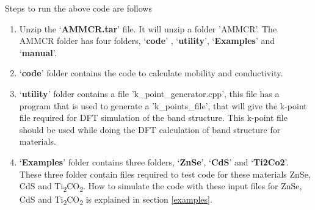 \documentclass[12pt]{article}
\begin{document}
Steps to run the above code are follows

\begin{enumerate}

\item Unzip the \lq \textbf{AMMCR.tar}\rq \hspace{0.5mm} file. It will unzip a folder 'AMMCR'. The AMMCR folder has four folders, \lq \textbf{code}\rq \hspace{0.5mm} , \lq \textbf{utility}\rq \hspace{0.5mm}, \lq \textbf{Examples}\rq \hspace{0.5mm} and \lq \textbf{manual}\rq \hspace{0.5mm}.

\item \lq \textbf{code}\rq \hspace{0.5mm} folder contains the code to calculate mobility and conductivity. 

\item \lq \textbf{utility}\rq \hspace{0.5mm} folder contains a file 'k\_point\_generator.cpp', this file has a program that is used to generate a 'k\_points\_file', that will give the k-point file required for DFT simulation of the band structure. This k-point file should be used while doing the DFT calculation of band structure for materials.   

\item \lq \textbf{Examples}\rq \hspace{0.5mm} folder contains three folders, \lq \textbf{ZnSe}\rq, \lq \textbf{CdS}\rq \hspace{0.5mm} and \lq \textbf{Ti2Co2}\rq \hspace{0.5mm}. These three folder contain files required to test code for these materials ZnSe, CdS and Ti\textsubscript{2}CO\textsubscript{2}. How to simulate the code with these input files for ZnSe, CdS and Ti\textsubscript{2}CO\textsubscript{2} is explained in section \ref{examples}.  



\end{enumerate}
\end{document}
